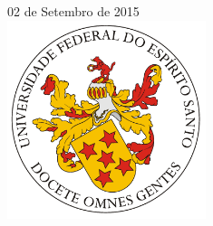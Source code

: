 \documentclass[a4paper,12pt]{article}
\begin{document}
\begin{titlepage}


{\large 02 de Setembro de 2015}\\[2cm] %


\includegraphics[width=58mm]{LogoUfes.png}\\[1cm] %


\vfill %

\end{titlepage}





\begin{abstract}
Trabalho da disciplina de Estrutura de Dados II, que consiste na implementação 
de quatro soluções diferentes para o Problema do Caixeiro Viajante. As soluções 
são os algoritmos de solução ótima, heurística do vizinho mais próximo, heurística 
de melhoramento 2-opt e heurística do envoltório convexo.
\end{abstract}

\end{document}
